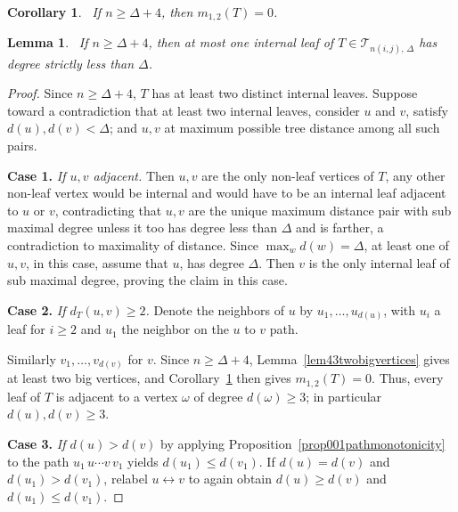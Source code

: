 \documentclass[12pt]{amsart}
\newtheorem{lemma}[theorem]{Lemma}
\newtheorem{corollary}[theorem]{Corollary}
\newcommand{\TT}{\mathcal{T}}
\begin{document}
\begin{corollary}~\label{cor001m12zero}
If $n\ge \Delta+4$, then $m_{1,2}(T)=0$.
\end{corollary}


\begin{lemma}~\label{lem001atmostoneinternalleaf}
If $n\geqslant \Delta+4$, then at most one internal leaf of $T\in \TT_{n(i,j),\,\Delta}$ has degree strictly less than $\Delta$.
\end{lemma}
\begin{proof}
Since $n\geqslant\Delta+4$, $T$ has at least two distinct internal leaves. 
Suppose toward a contradiction that at least two internal leaves, consider $u$ and
$v$, satisfy $d(u),d(v)<\Delta$; and  $u,v$ at maximum possible
tree distance among all such pairs.

\medskip

\noindent \textbf{Case 1.} \emph{If $u,v$ adjacent.} Then $u,v$ are the only non-leaf vertices of $T$, any other non-leaf vertex would be internal and would have to be an
internal leaf adjacent to $u$ or $v$, contradicting that $u,v$ are the unique
maximum distance pair with sub maximal degree unless it too has degree  less than $\Delta$
and is farther, a contradiction to maximality of distance. Since $\max_w d(w)=\Delta$, at least one of $u,v$, in this case, assume that $u$, has degree
$\Delta$. Then $v$ is the only internal leaf of sub maximal degree, proving the claim in this case.

\medskip

\noindent \textbf{Case 2.} \emph{If $d_T(u,v)\geqslant 2$.} Denote the neighbors of $u$ by
$u_1,\dots,u_{d(u)}$, with $u_i$ a leaf for $i\geqslant 2$ and $u_1$ the neighbor on
the $u$ to $v$ path. 

Similarly $v_1,\dots,v_{d(v)}$ for $v$. Since
$n\geqslant \Delta+4$, Lemma~\ref{lem43twobigvertices} gives at least two big
vertices, and Corollary~\ref{cor001m12zero} then gives $m_{1,2}(T)=0$. Thus, every leaf
of $T$ is adjacent to a vertex $\omega$ of degree $d(\omega)\geqslant 3$; in particular $d(u),d(v)\geqslant 3$.

\medskip

\noindent \textbf{Case 3.} \emph{If $d(u)>d(v)$} by applying Proposition~\ref{prop001pathmonotonicity} to the path
$u_1\,u\cdots v\,v_1$   yields $d(u_1)\leqslant d(v_1)$. If $d(u)=d(v)$ and
$d(u_1)>d(v_1)$, relabel $u\leftrightarrow v$ to again obtain $d(u)\geqslant d(v)$ and
$d(u_1)\leqslant d(v_1)$.


\end{proof}
\end{document}
